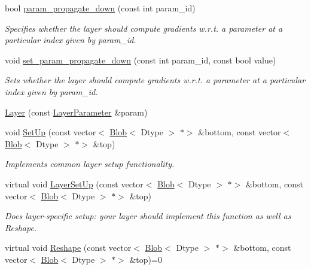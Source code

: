 \begin{DoxyCompactItemize}
bool \mbox{\hyperlink{classcaffe_1_1_layer_a1a3708013b0231e71d725252e10ce6e3}{param\+\_\+propagate\+\_\+down}} (const int param\+\_\+id)
\begin{DoxyCompactList}\small\item\em Specifies whether the layer should compute gradients w.\+r.\+t. a parameter at a particular index given by param\+\_\+id. \end{DoxyCompactList}\item 
\mbox{\label{classcaffe_1_1_layer_a9a6fcb843803ed556f0a69cc2864379b}} 
void \mbox{\hyperlink{classcaffe_1_1_layer_a9a6fcb843803ed556f0a69cc2864379b}{set\+\_\+param\+\_\+propagate\+\_\+down}} (const int param\+\_\+id, const bool value)
\begin{DoxyCompactList}\small\item\em Sets whether the layer should compute gradients w.\+r.\+t. a parameter at a particular index given by param\+\_\+id. \end{DoxyCompactList}\item 
\mbox{\hyperlink{classcaffe_1_1_layer_a7b4e4ccea08c7b8b15acc6829d5735f6}{Layer}} (const \mbox{\hyperlink{classcaffe_1_1_layer_parameter}{Layer\+Parameter}} \&param)
\item 
void \mbox{\hyperlink{classcaffe_1_1_layer_a18d6bfdb535ab8e96a971dec4ae39a84}{Set\+Up}} (const vector$<$ \mbox{\hyperlink{classcaffe_1_1_blob}{Blob}}$<$ Dtype $>$ $\ast$$>$ \&bottom, const vector$<$ \mbox{\hyperlink{classcaffe_1_1_blob}{Blob}}$<$ Dtype $>$ $\ast$$>$ \&top)
\begin{DoxyCompactList}\small\item\em Implements common layer setup functionality. \end{DoxyCompactList}\item 
virtual void \mbox{\hyperlink{classcaffe_1_1_layer_a481323a3e0972c682787f2137468c29f}{Layer\+Set\+Up}} (const vector$<$ \mbox{\hyperlink{classcaffe_1_1_blob}{Blob}}$<$ Dtype $>$ $\ast$$>$ \&bottom, const vector$<$ \mbox{\hyperlink{classcaffe_1_1_blob}{Blob}}$<$ Dtype $>$ $\ast$$>$ \&top)
\begin{DoxyCompactList}\small\item\em Does layer-\/specific setup\+: your layer should implement this function as well as Reshape. \end{DoxyCompactList}\item 
virtual void \mbox{\hyperlink{classcaffe_1_1_layer_a7fe981e8af8d93d587acf2a952be563d}{Reshape}} (const vector$<$ \mbox{\hyperlink{classcaffe_1_1_blob}{Blob}}$<$ Dtype $>$ $\ast$$>$ \&bottom, const vector$<$ \mbox{\hyperlink{classcaffe_1_1_blob}{Blob}}$<$ Dtype $>$ $\ast$$>$ \&top)=0

\end{DoxyCompactItemize}
